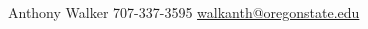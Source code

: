 \documentclass[lighthipster]{simplehipstercv}
\newlength{\rightcolwidth}
\begin{document}
\begin{paracol}{2}
 

\vfill{} %

\setlength{\parindent}{0pt}
\begin{minipage}[t]{\rightcolwidth}
\begin{center}\fontfamily{\sfdefault}\selectfont \color{black!70}
 {\small Anthony Walker  707-337-3595  \protect\url{walkanth@oregonstate.edu}
}
\end{center}
\end{minipage}

\end{paracol}
\end{document}
